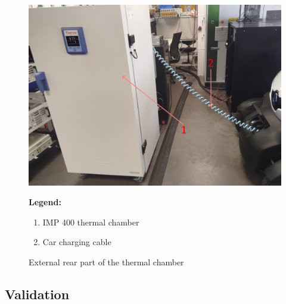 \begin{figure}[H]
    \centering
    \begin{minipage}{0.6\textwidth}
        \includegraphics[width=\linewidth]{figures/inst_inside_4.png}
    \end{minipage}%
    \hfill
    \begin{minipage}{0.35\textwidth}
        \small
        \textbf{Legend:}
        \begin{enumerate}
            \item IMP 400 thermal chamber
            \item Car charging cable
        \end{enumerate}
    \end{minipage}
    \caption{External rear part of the thermal chamber}
    \label{fig:inst_inside_4}
\end{figure}

\subsection{Validation}

